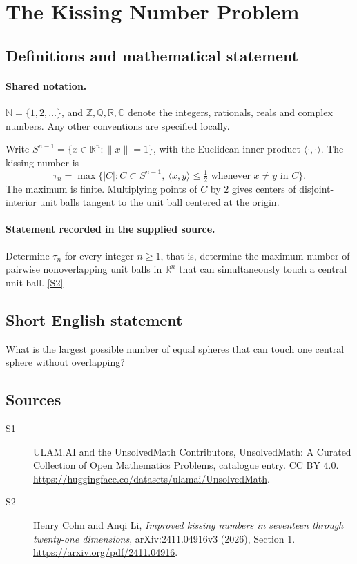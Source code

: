 \documentclass[11pt]{article}
\newcommand{\sref}[2]{\hyperlink{source:#1:#2}{[S#2]}}
\begin{document}
\section{The Kissing Number Problem}\label{statement}

\subsection{Definitions and mathematical statement}

\paragraph{Shared notation.}$\mathbb N=\{1,2,\ldots\}$, and $\mathbb Z,\mathbb Q,\mathbb R,\mathbb C$ denote the integers, rationals, reals and complex numbers. Any other conventions are specified locally.


Write $S^{n-1}=\{x\in\mathbb R^n:\lVert x\rVert=1\}$, with the Euclidean inner product $\langle\cdot,\cdot\rangle$. The kissing number is
\[
\tau_n=\max\{|C|:C\subset S^{n-1},\ \langle x,y\rangle\leq\tfrac12\text{ whenever }x\ne y\text{ in }C\}.
\]
The maximum is finite. Multiplying points of $C$ by $2$ gives centers of disjoint-interior unit balls tangent to the unit ball centered at the origin.
\paragraph{Statement recorded in the supplied source.}
Determine $\tau_n$ for every integer $n\geq1$, that is, determine the maximum number of pairwise nonoverlapping unit balls in $\mathbb R^n$ that can simultaneously touch a central unit ball. \sref{statement}{2}

\subsection{Short English statement}
What is the largest possible number of equal spheres that can touch one central sphere without overlapping?
\subsection{Sources}
\begin{description}
\item[\hypertarget{source:statement:1}{S1}] ULAM.AI and the UnsolvedMath Contributors, UnsolvedMath: A Curated Collection of Open Mathematics Problems, catalogue entry. CC BY 4.0. \url{https://huggingface.co/datasets/ulamai/UnsolvedMath}.
\item[\hypertarget{source:statement:2}{S2}] Henry Cohn and Anqi Li, \emph{Improved kissing numbers in seventeen through twenty-one dimensions}, arXiv:2411.04916v3 (2026), Section 1. \url{https://arxiv.org/pdf/2411.04916}.
\end{description}
\label{end:statement}
\end{document}

